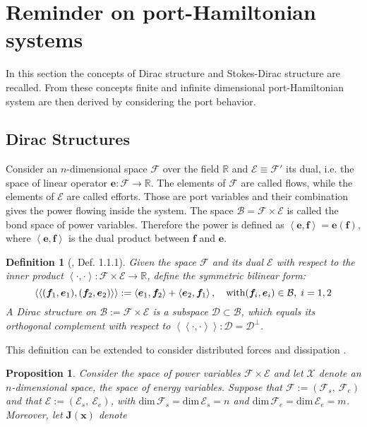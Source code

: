 \documentclass[11pt]{article}
\newtheorem{definition}{Definition}
\newtheorem{proposition}{Proposition}
\begin{document}
	
	{
		\section{Reminder on port-Hamiltonian systems}
		In this section the concepts of Dirac structure and Stokes-Dirac structure are recalled. From these concepts finite and infinite dimensional port-Hamiltonian system are then derived by considering the port behavior. 
		\subsection{Dirac Structures}
		Consider an $n$-dimensional space $\mathcal{F}$ over the field $\mathbb{R}$ and $\mathcal{E} \equiv \mathcal{F}'$ its dual, i.e. the space of linear operator $\bm{e} : \mathcal{F} \rightarrow \mathbb{R}$. The elements of $\mathcal{F}$ are called flows, while the elements of $\mathcal{E}$ are called efforts. Those are port variables and their combination gives the power flowing inside the system. The space $\mathcal{B} = \mathcal{F} \times \mathcal{E}$ is called the bond space of power variables. Therefore the power is defined as  $\left\langle \bm{e}, \bm{f} \right\rangle = \bm{e}(\bm{f})$, where $\left\langle \bm{e} , \bm{f} \right\rangle$ is the dual product between $\bm{f}$ and $\bm{e}$.
		\begin{definition}[\cite{CourantDiracStructure}, Def. 1.1.1]
			Given the space $\mathcal{F}$ and its dual $\mathcal{E}$ with respect to the inner product $\left\langle \cdot , \cdot \right\rangle : \mathcal{F} \times \mathcal{E} \rightarrow \mathbb{R}$, define the symmetric bilinear form:
			\begin{equation}
			\left\langle \left\langle (\bm{f}_1, \bm{e}_1), (\bm{f}_2, \bm{e}_2) \right\rangle \right\rangle := \left\langle \bm{e}_1, \bm{f}_2 \right\rangle +  \left\langle \bm{e}_2, \bm{f}_1 \right\rangle, \quad \text{with} \text (\bm{f}_i, \bm{e}_i) \in \mathcal{B}, \; i = 1, 2
			\end{equation}
			A Dirac structure on $\mathcal{B} := \mathcal{F} \times \mathcal{E}$ is a subspace $\mathcal{D} \subset \mathcal{B}$, which equals its orthogonal complement with respect to $\left\langle \left\langle \cdot, \cdot \right\rangle \right\rangle: \mathcal{D} =\mathcal{D}^\perp$.
		\end{definition}
		This definition can be extended to consider distributed forces and dissipation \cite{Villegas}.
		\begin{proposition}
			\label{prop:Dirac}
			Consider the space of power variables $\mathcal{F} \times \mathcal{E}$ and let $\mathcal{X}$ denote an $n$-dimensional space, the space of energy variables. Suppose that $\mathcal{F} := (\mathcal{F}_s, \ \mathcal{F}_e )$ and that $\mathcal{E} := (\mathcal{E}_s,  \ \mathcal{E}_e )$, with $\text{dim} \, \mathcal{F}_s = \text{dim} \, \mathcal{E}_s = n$ and $\text{dim} \, \mathcal{F}_e = \text{dim} \, \mathcal{E}_e = m$. Moreover, let $\bm{J}(\bm{x})$ denote

\end{proposition}}
\end{document}
